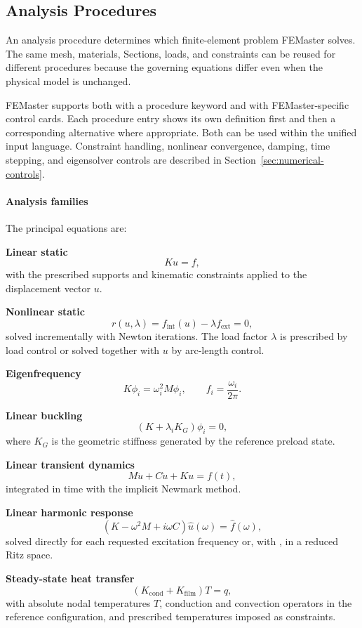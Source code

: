 \subsection{Analysis Procedures}
\label{sec:analysis-procedures}

An analysis procedure determines which finite-element problem FEMaster solves. The same mesh, materials, Sections, loads, and constraints can be reused for different procedures because the governing equations differ even when the physical model is unchanged.

FEMaster supports both  with a procedure keyword and
 with FEMaster-specific control cards.
Each procedure entry shows its own definition first and then a
corresponding alternative where appropriate. Both can be used
within the unified input language. Constraint handling, nonlinear
convergence, damping, time stepping, and eigensolver controls are
described in Section~\ref{sec:numerical-controls}.

\paragraph*{Analysis families}

The principal equations are:

\textbf{Linear static}
\[
K u=f,
\]
with the prescribed supports and kinematic constraints applied to the displacement vector \(u\).

\textbf{Nonlinear static}
\[
r(u,\lambda)=f_\mathrm{int}(u)-\lambda f_\mathrm{ext}=0,
\]
solved incrementally with Newton iterations. The load factor \(\lambda\) is prescribed by load control or solved together with \(u\) by arc-length control.

\textbf{Eigenfrequency}
\[
K\phi_i=\omega_i^2 M\phi_i,
\qquad
f_i=\frac{\omega_i}{2\pi}.
\]

\textbf{Linear buckling}
\[
\left(K+\lambda_i K_G\right)\phi_i=0,
\]
where \(K_G\) is the geometric stiffness generated by the reference preload state.

\textbf{Linear transient dynamics}
\[
M\ddot u+C\dot u+Ku=f(t),
\]
integrated in time with the implicit Newmark method.

\textbf{Linear harmonic response}
\[
\left(K-\omega^2M+i\omega C\right)\hat u(\omega)=\hat f(\omega),
\]
solved directly for each requested excitation frequency or, with , in a reduced Ritz space.

\textbf{Steady-state heat transfer}
\[
\left(K_\mathrm{cond}+K_\mathrm{film}\right)T=q,
\]
with absolute nodal temperatures \(T\), conduction and convection operators in the reference configuration, and prescribed temperatures imposed as constraints.

